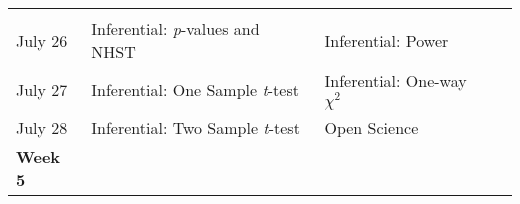 \documentclass[
]{book}
\begin{document}
\begin{longtable}[]{@{}llll@{}}
\begin{minipage}[t]{0.29\columnwidth}
\strut
\end{minipage} & \begin{minipage}[t]{0.18\columnwidth}\raggedright
\strut
\end{minipage}\tabularnewline
\begin{minipage}[t]{0.09\columnwidth}\raggedright
July 26\strut
\end{minipage} & \begin{minipage}[t]{0.32\columnwidth}\raggedright
Inferential: \emph{p}-values and NHST\strut
\end{minipage} & \begin{minipage}[t]{0.29\columnwidth}\raggedright
Inferential: Power\strut
\end{minipage} & \begin{minipage}[t]{0.18\columnwidth}\raggedright
\strut
\end{minipage}\tabularnewline
\begin{minipage}[t]{0.09\columnwidth}\raggedright
July 27\strut
\end{minipage} & \begin{minipage}[t]{0.32\columnwidth}\raggedright
Inferential: One Sample \emph{t}-test\strut
\end{minipage} & \begin{minipage}[t]{0.29\columnwidth}\raggedright
Inferential: One-way \(\chi^2\)\strut
\end{minipage} & \begin{minipage}[t]{0.18\columnwidth}\raggedright
\strut
\end{minipage}\tabularnewline
\begin{minipage}[t]{0.09\columnwidth}\raggedright
July 28\strut
\end{minipage} & \begin{minipage}[t]{0.32\columnwidth}\raggedright
Inferential: Two Sample \emph{t}-test\strut
\end{minipage} & \begin{minipage}[t]{0.29\columnwidth}\raggedright
Open Science\strut
\end{minipage} & \begin{minipage}[t]{0.18\columnwidth}\raggedright
\strut
\end{minipage}\tabularnewline
\begin{minipage}[t]{0.09\columnwidth}\raggedright
\textbf{Week 5}\strut
\end{minipage} & \begin{minipage}[t]{0.32\columnwidth}\raggedright
\strut
\end{minipage} & \begin{minipage}[t]{0.29\columnwidth}\raggedright

\end{minipage}
\end{longtable}
\end{document}
